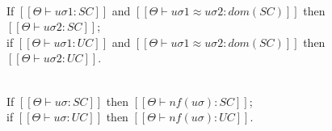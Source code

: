 \begin{corollary}
    \label{corollary:sat-equiv}
    \hfill\\
    If $[[ Θ ⊢ uσ1 : SC ]]$ and $[[Θ ⊢ uσ1 ≈ uσ2 : dom(SC) ]]$ then $[[ Θ ⊢ uσ2 : SC ]]$;\\
    if $[[ Θ ⊢ uσ1 : UC ]]$ and $[[Θ ⊢ uσ1 ≈ uσ2 : dom(SC) ]]$ then $[[ Θ ⊢ uσ2 : UC ]]$.
\end{corollary}

\begin{corollary}
    \label{corollary:nf-sat}
    \hfill\\
    If $[[Θ ⊢ uσ : SC]]$ then $[[Θ  ⊢ nf(uσ) : SC]]$;\\
    if $[[Θ ⊢ uσ : UC]]$ then $[[Θ  ⊢ nf(uσ) : UC]]$.
\end{corollary}



